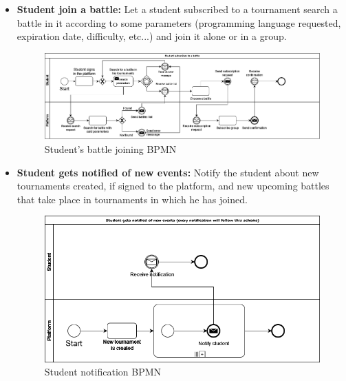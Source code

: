 \documentclass{article}
\begin{document}
{\begin{itemize}
            \item \textbf{Student join a battle:} Let a student subscribed to a tournament search a battle in it according to some parameters (programming language requested, expiration date, difficulty, etc...) and join it alone or in a group.
            \begin{figure}[H]
                \centering
                \hspace*{-1.85cm}\includegraphics[scale=0.4]{images/BPMN/BattleSubscription.png}
                \caption{Student's battle joining BPMN}
                \label{fig:studBattleJoinBPMN}
            \end{figure}

            \item \textbf{Student gets notified of new events:} Notify the student about new tournaments created, if signed to the platform, and new upcoming battles that take place in tournaments in which he has joined.
            \begin{figure}[H]
                \centering
                \includegraphics[scale=0.4]{images/BPMN/StudentNotification.png}
                \caption{Student notification BPMN}
                \label{fig:studNotificationBPMN}
            \end{figure}
            

\end{itemize}}
\end{document}
